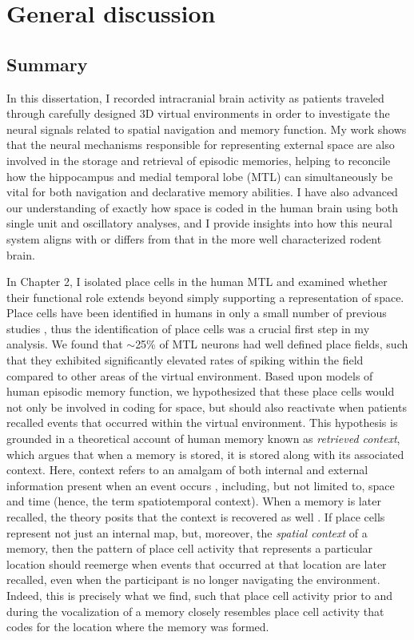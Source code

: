 \chapter{General discussion}
\large

\section{Summary}

In this dissertation, I recorded intracranial brain activity as patients traveled through carefully designed 3D virtual environments in order to investigate the neural signals related to spatial navigation and memory function. My work shows that the neural mechanisms responsible for representing external space are also involved in the storage and retrieval of episodic memories, helping to reconcile how the hippocampus and medial temporal lobe (MTL) can simultaneously be vital for both navigation and declarative memory abilities. I have also advanced our understanding of exactly how space is coded in the human brain using both single unit and oscillatory analyses, and I provide insights into how this neural system aligns with or differs from that in the more well characterized rodent brain. 

In Chapter 2, I isolated place cells in the human MTL and examined whether their functional role extends beyond simply supporting a representation of space. Place cells have been identified in humans in only a small number of previous studies \citep{EkstEtal03,JacoEtal10}, thus the identification of place cells was a crucial first step in my analysis. We found that $\sim$25\% of MTL neurons had well defined place fields, such that they exhibited significantly elevated rates of spiking within the field compared to other areas of the virtual environment. Based upon models of human episodic memory function, we hypothesized that these place cells would not only be involved in coding for space, but should also reactivate when patients recalled events that occurred within the virtual environment. This hypothesis is grounded in a theoretical account of human memory known as \textit{retrieved context}, which argues that when a memory is stored, it is stored along with its associated context. Here, context refers to an amalgam of both internal and external information present when an event occurs \citep{McGe42,Bowe72}, including, but not limited to, space and time (hence, the term spatiotemporal context). When a memory is later recalled, the theory posits that the context is recovered as well \citep{HowaKaha02a,PolyEtalTulv,LohnKaha13a}. If place cells represent not just an internal map, but, moreover, the \textit{spatial context} of a memory, then the pattern of place cell activity that represents a particular location should reemerge when events that occurred at that location are later recalled, even when the participant is no longer navigating the environment. Indeed, this is precisely what we find, such that place cell activity prior to and during the vocalization of a memory closely resembles place cell activity that codes for the location where the memory was formed.


